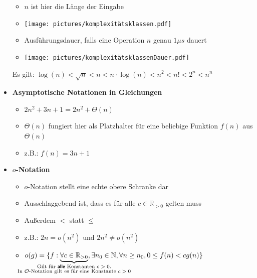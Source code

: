 \documentclass[
    ngerman,
    color=3b,
    load_common, %
    summary,
    boxarc,
]{tuda_summary}
\begin{document}
\begin{itemize}
          \begin{itemize}
              \item $n$ ist hier die Länge der Eingabe
              \item[] \texttt{[image: pictures/komplexitätsklassen.pdf]}
              \item Ausführungsdauer, falls eine Operation $n$ genau $1\mu s$ dauert
              \item[] \texttt{[image: pictures/komplexitätsklassenDauer.pdf]}
          \end{itemize}
          Es gilt: $\log(n) < \sqrt{n} < n < n\cdot \log(n) < n^2 < n! < 2^n<n^n$
    \item \textbf{Asymptotische Notationen in Gleichungen}
          \begin{itemize}
              \item $2n^2 + 3n + 1 = 2n^2 + \Theta(n)$
              \item $\Theta(n)$ fungiert hier als Platzhalter für eine beliebige Funktion $f(n)$ aus $\Theta(n)$
              \item z.B.: $f(n) = 3n + 1$
          \end{itemize}

    \item \textbf{$o$-Notation}
          \begin{itemize}
              \item $o$-Notation stellt eine echte obere Schranke dar
              \item Ausschlaggebend ist, dass es für alle $c \in \mathbb{R}_{>0}$ gelten muss
              \item Au\ss erdem $<$ statt $\leq$
              \item z.B.: $2n = o(n^2)$ und $2n^2 \neq o(n^2)$
              \item[] %
                    $o(g)=\{f:\underbrace{\forall c \in \mathbb{R}_{>0}}_{
                        \mathclap{
                            \substack{
                                \text{Gilt für \fatsf{alle} Konstanten $c>0$.}\\
                                \text{In $\mathcal{O}$-Notation gilt es für eine Konstante $c>0$}}}
                        }, \exists n_0 \in \mathbb{N}, \forall n \geq n_0, 0\leq f(n)<cg(n)\}$
          \end{itemize}


\end{itemize}
\end{document}
